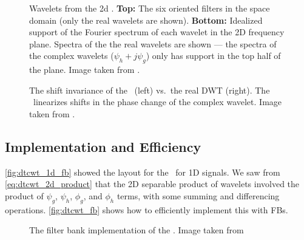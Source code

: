   \begin{figure}
    \centering
      \caption[Wavelets from the 2D \DTCWT]
              {Wavelets from the 2d \DTCWT\@. \textbf{Top:} The six  oriented filters
      in the space domain (only the real wavelets are shown). \textbf{Bottom:}
      Idealized support of the Fourier spectrum of each wavelet in the 2D
      frequency plane. Spectra of the the real wavelets are shown --- the
      spectra of the complex wavelets ($\psi_h + j\psi_g$) only has support in the top
      half of the plane. Image taken from \citep{selesnick_dual-tree_2005}.}
      \label{fig:dtcwt_wavelets}
  \end{figure}
  \begin{figure}
    \centering
      \makebox[\textwidth][c]{%
      }
      \caption[The shift invariance ofthe \DTCWT\ vs.\ the real DWT]
              {The shift invariance of the \DTCWT\ (left) vs.\ the real DWT
              (right). The \DTCWT\ linearizes shifts in the phase change of the complex
              wavelet. Image taken from \citep{kingsbury_dual-tree_1998}.}
      \label{fig:dtcwt_shift_invariance}
  \end{figure}

\subsection{Implementation and Efficiency}\label{sec:dtcwt_efficiency}
  \autoref{fig:dtcwt_1d_fb} showed the layout for the \DTCWT\ for 1D signals. We
  saw from \autoref{eq:dtcwt_2d_product} that the 2D separable product of wavelets
  involved the product of $\psi_g$, $\psi_h$, $\phi_g$, and $\phi_h$ terms, with
  some summing and differencing operations. \autoref{fig:dtcwt_fb} shows how to
  efficiently implement this with FBs.
  
  \begin{figure}
    \centering
    \makebox[\textwidth][c]{%
    }
      \caption[The filter bank implementation of the \DTCWT]
              {The filter bank implementation of the \DTCWT\@. Image taken from 
              \citep{kingsbury_image_1999}}
      \label{fig:dtcwt_fb}
  \end{figure}

